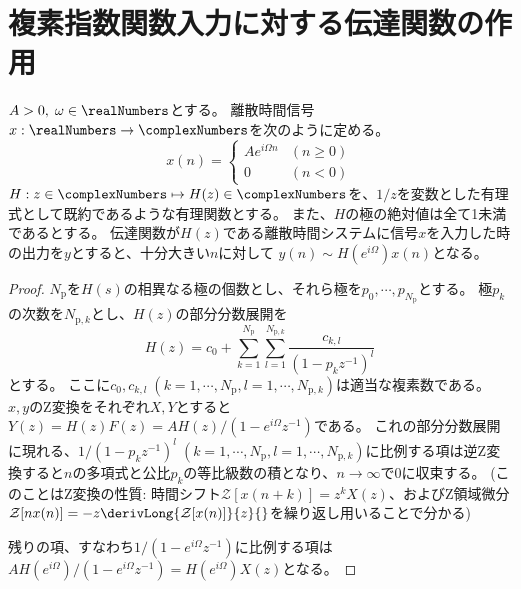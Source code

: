 		\section{複素指数関数入力に対する伝達関数の作用}
			\begin{shadebox}
				$A>0,\;\omega \in \realNumbers$とする。
				離散時間信号$x: \realNumbers \to \complexNumbers$を次のように定める。
				\[
					x(n) =
					\begin{cases}
						Ae^{i\Omega n} & (n\geq 0) \\
						0 & (n<0)
					\end{cases}
				\]
				$H: z\in\complexNumbers \mapsto H(z) \in \complexNumbers$を、$1/z$を変数とした有理式として既約であるような有理関数とする。
				また、$H$の極の絶対値は全て1未満であるとする。
				伝達関数が$H(z)$である離散時間システムに信号$x$を入力した時の出力を$y$とすると、十分大きい$n$に対して
				$y(n) \sim H(e^{i\Omega})x(n)$となる。
			\end{shadebox}
			\begin{proof}
				\quad\par
				$N_\text{p}$を$H(s)$の相異なる極の個数とし、それら極を$p_0,\cdots,p_{N_\text{p}}$とする。
				極$p_k$の次数を$N_{\text{p},k}$とし、$H(z)$の部分分数展開を
				\[ H(z) = c_0 + \sum_{k=1}^{N_\mathrm{p}} \sum_{l=1}^{N_{\mathrm{p},k}} \frac{c_{k,l}}{(1-p_kz^{-1})^l} \]
				とする。
				ここに$c_0,c_{k,l}\;(k=1,\cdots,N_\mathrm{p},l=1,\cdots,N_{\mathrm{p},k})$は適当な複素数である。
				$x,y$のZ変換をそれぞれ$X,Y$とすると$Y(z) = H(z)F(z) = A H(z)/(1-e^{i\Omega}z^{-1})$である。
				これの部分分数展開に現れる、$1/(1-p_k z^{-1})^l\;(k=1,\cdots,N_\mathrm{p},l=1,\cdots,N_{\mathrm{p},k})$に比例する項は逆Z変換すると$n$の多項式と公比$p_k$の等比級数の積となり、$n\to\infty$で0に収束する。
				(このことはZ変換の性質: 時間シフト$\mathcal{Z}[x(n+k)] = z^kX(z)$、およびZ領域微分$\mathcal{Z}[nx(n)] = -z\derivLong{\mathcal{Z}[x(n)]}{z}{}$を繰り返し用いることで分かる)
				\par
				残りの項、すなわち$1/(1-e^{i\Omega}z^{-1})$に比例する項は$AH(e^{i\Omega})/(1-e^{i\Omega}z^{-1}) = H(e^{i\Omega})X(z)$となる。
			\end{proof}
